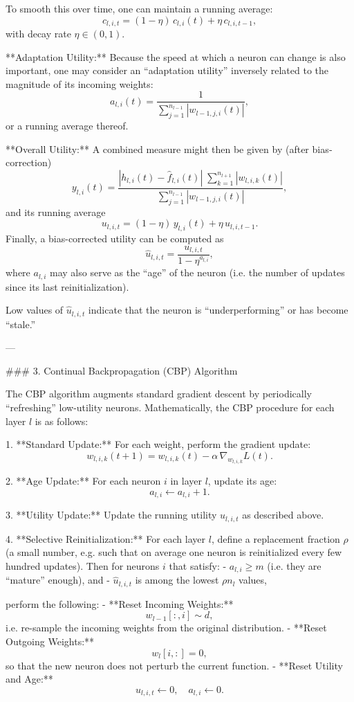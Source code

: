 To smooth this over time, one can maintain a running average:
$$
c_{l,i,t} = (1-\eta)\, c_{l,i}(t) + \eta\, c_{l,i,t-1},
$$
with decay rate $\eta \in (0,1)$.

**Adaptation Utility:**  
Because the speed at which a neuron can change is also important, one may consider an “adaptation utility” inversely related to the magnitude of its incoming weights:
$$
a_{l,i}(t) = \frac{1}{\sum_{j=1}^{n_{l-1}} |w_{l-1,j,i}(t)|},
$$
or a running average thereof.

**Overall Utility:**  
A combined measure might then be given by (after bias‐correction)
$$
y_{l,i}(t) = \frac{|h_{l,i}(t) - \hat{f}_{l,i}(t)|\;\sum_{k=1}^{n_{l+1}} |w_{l,i,k}(t)|}{\sum_{j=1}^{n_{l-1}} |w_{l-1,j,i}(t)|},
$$
and its running average
$$
u_{l,i,t} = (1-\eta)\, y_{l,i}(t) + \eta\, u_{l,i,t-1}.
$$
Finally, a bias-corrected utility can be computed as
$$
\hat{u}_{l,i,t} = \frac{u_{l,i,t}}{1-\eta^{a_{l,i}}},
$$
where $a_{l,i}$ may also serve as the “age” of the neuron (i.e. the number of updates since its last reinitialization).

Low values of $\hat{u}_{l,i,t}$ indicate that the neuron is “underperforming” or has become “stale.”

---

### 3. Continual Backpropagation (CBP) Algorithm

The CBP algorithm augments standard gradient descent by periodically “refreshing” low-utility neurons. Mathematically, the CBP procedure for each layer $l$ is as follows:

1. **Standard Update:**  
   For each weight, perform the gradient update:
   $$
   w_{l,i,k}(t+1) = w_{l,i,k}(t) - \alpha\, \nabla_{w_{l,i,k}} L(t).
   $$

2. **Age Update:**  
   For each neuron $i$ in layer $l$, update its age:
   $$
   a_{l,i} \leftarrow a_{l,i} + 1.
   $$

3. **Utility Update:**  
   Update the running utility $u_{l,i,t}$ as described above.

4. **Selective Reinitialization:**  
   For each layer $l$, define a replacement fraction $\rho$ (a small number, e.g. such that on average one neuron is reinitialized every few hundred updates). Then for neurons $i$ that satisfy:
   - $a_{l,i} \ge m$ (i.e. they are “mature” enough), and
   - $\hat{u}_{l,i,t}$ is among the lowest $\rho n_l$ values,
   
   perform the following:
   - **Reset Incoming Weights:**  
     $$
     w_{l-1}[:, i] \sim d,
     $$
     i.e. re-sample the incoming weights from the original distribution.
   - **Reset Outgoing Weights:**  
     $$
     w_{l}[i, :] = 0,
     $$
     so that the new neuron does not perturb the current function.
   - **Reset Utility and Age:**  
     $$
     u_{l,i,t} \leftarrow 0,\quad a_{l,i} \leftarrow 0.
     $$

